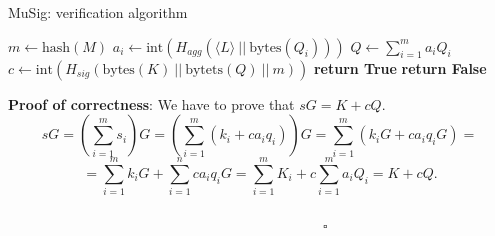 \bigskip

\begin{algorithm}
	\caption{MuSig: verification algorithm}
	\label{alg:musig_ver}
	\begin{algorithmic}[1]
		\State $m \gets \text{hash}(M)$
		\State $a_i \gets \text{int}(H_{agg}(\langle L \rangle \ || \ \text{bytes}(Q_i)))$
		\EndFor
		\State $Q \gets \sum_{i = 1}^{m}a_iQ_i$
		\State $c \gets \text{int}(H_{sig}(\text{bytes}(K) \ || \ \text{bytets}(Q) \ || \ m))$
		\State \textbf{return True}
		\EndIf
		\State \textbf{return False}
		\EndProcedure
	\end{algorithmic}
\end{algorithm}

\bigskip
\noindent
{\bf Proof of correctness}: We have to prove that $sG = K + cQ$.
\\
$$sG = \left(\sum_{i = 1}^{m} s_i\right)G = \left(\sum_{i = 1}^{m}(k_i + ca_iq_i)\right)G = \sum_{i = 1}^{m}(k_iG + ca_iq_iG) =$$
$$= \sum_{i = 1}^{m}k_iG + \sum_{i = 1}^{n} ca_iq_iG = \sum_{i = 1}^{m}K_i + c\sum_{i  = 1}^{m}a_iQ_i = K + cQ.$$
\ \ \ \ \ \ \ \ \ \ \ \ \ \ \ \ \ \ \ \ \ \ \ \ \ \ \ \ \ \ \ \ \ \ \ \ \ \ \ \ \ \ \ \ \ \ \ \ \ \ \ \ \ \ \ \ \ \ \ \ \ \ \ \ \ \ \ \ \ \ \ \ \ \ \ \ \ \ \ \ \ \ \ \ \ \ \ \ \ \ \ \ \ \ \ \ \ \ \ \ \ \ \ \ \ \ \ \ \ \ \ \ \ \ \ \ \ $\square$


